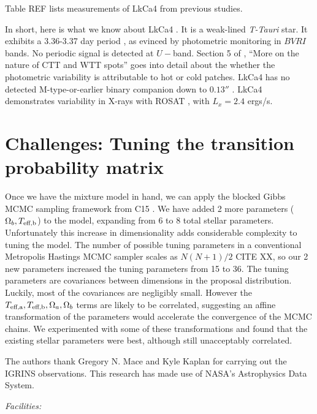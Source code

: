 \documentclass[onecolumn]{emulateapj}%
\newcommand{\iancze}{{\sc C15 }}
\newcommand{\name}{LkCa4 }
\begin{document}
Table REF lists measurements of LkCa4 from previous studies.


In short, here is what we know about \name.  It is a weak-lined \emph{T-Tauri} star.  It exhibits a 3.36-3.37 day period \citep{1993AJ....106.1608V,1994IBVS.4042....1G}, as evinced by photometric monitoring in $BVRI$ bands.  No periodic signal is detected at $U-$band.  Section 5 of \citet{1993AJ....106.1608V}, ``More on the nature of CTT and WTT spots'' goes into detail about the whether the photometric variability is attributable to hot or cold patches.  \name has no detected M-type-or-earlier binary companion down to $0.13''$ \citep{1993A&A...278..129L}.  \name demonstrates variability in X-rays with ROSAT \citep{1994ApJ...424..237S}, with $L_{x}=2.4$ ergs/s.


\section{Challenges: Tuning the transition probability matrix}
\label{sec:MC-challenges}

Once we have the mixture model in hand, we can apply the blocked Gibbs MCMC sampling framework from \iancze.  We have added 2 more parameters ($\Omega_b, T_\textrm{eff,b}$) to the model, expanding from 6 to 8 total stellar parameters.  Unfortunately this increase in dimensionality adds considerable complexity to tuning the model.  The number of possible tuning parameters in a conventional Metropolis Hastings MCMC sampler scales as $N(N+1)/2$ CITE XX, so our 2 new parameters increased the tuning parameters from 15 to 36.  The tuning parameters are covariances between dimensions in the proposal distribution.  Luckily, most of the covariances are negligibly small.  However the $T_\textrm{eff,a}, T_\textrm{eff,b}, \Omega_a, \Omega_b$ terms are likely to be correlated, suggesting an affine transformation of the parameters would accelerate the convergence of the MCMC chains.  We experimented with some of these transformations and found that the existing stellar parameters were best, although still unacceptably correlated.


\acknowledgements
The authors thank Gregory N. Mace and Kyle Kaplan for carrying out the IGRINS observations. This research has made use of NASA's Astrophysics Data System.

{\it Facilities:} 

\clearpage



\end{document}
